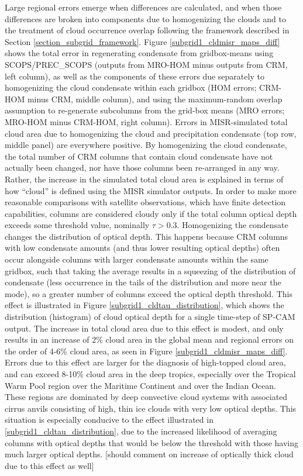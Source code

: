 Large regional errors emerge when differences are calculated, and when those differences are broken into components due to homogenizing the clouds and to the treatment of cloud occurrence overlap following the framework described in Section \ref{section_subgrid_framework}. Figure \ref{subgrid1_cldmisr_maps_diff} shows the total error in regenerating condensate from gridbox-means using SCOPS/PREC\_SCOPS (outputs from MRO-HOM minus outputs from CRM, left column), as well as the components of these errors due separately to homogenizing the cloud condensate within each gridbox (HOM errors; CRM-HOM minus CRM, middle column), and using the maximum-random overlap assumption to re-generate subcolumns from the grid-box means (MRO errors; MRO-HOM minus CRM-HOM, right column). Errors in MISR-simulated total cloud area due to homogenizing the cloud and precipitation condensate (top row, middle panel) are everywhere positive. By homogenizing the cloud condensate, the total number of CRM columns that contain cloud condensate have not actually been changed, nor have those columns been re-arranged in any way. Rather, the increase in the simulated total cloud area is explained in terms of how ``cloud'' is defined using the MISR simulator outputs. In order to make more reasonable comparisons with satellite observations, which have finite detection capabilities, columns are considered cloudy only if the total column optical depth exceeds some threshold value, nominally $\tau > 0.3$. Homogenizing the condensate changes the distribution of optical depth. This happens because CRM columns with low condensate amounts (and thus lower resulting optical depths) often occur alongside columns with larger condensate amounts within the same gridbox, such that taking the average results in a squeezing of the distribution of condensate (less occurrence in the tails of the distribution and more near the mode), so a greater number of columns exceed the optical depth threshold. This effect is illustrated in Figure \ref{subgrid1_cldtau_distribution}, which shows the distribution (histogram) of cloud optical depth for a single time-step of SP-CAM output. The increase in total cloud area due to this effect is modest, and only results in an increase of 2\% cloud area in the global mean and regional errors on the order of 4-6\% cloud area, as seen in Figure \ref{subgrid1_cldmisr_maps_diff}. Errors due to this effect are larger for the diagnosis of high-topped cloud area, and can exceed 8-10\% cloud area in the deep tropics, especially over the Tropical Warm Pool region over the Maritime Continent and over the Indian Ocean. These regions are dominated by deep convective cloud systems with associated cirrus anvils consisting of high, thin ice clouds with very low optical depths. This situation is especially conducive to the effect illustrated in \ref{subgrid1_cldtau_distribution}, due to the increased likelihood of averaging columns with optical depths that would be below the threshold with those having much larger optical depths. [should comment on increase of optically thick cloud due to this effect as well]

